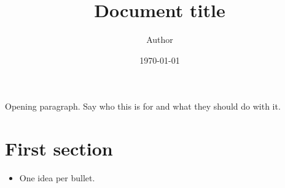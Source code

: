 \documentclass[11pt,a4paper]{article}
\title{Document title}
\author{Author}
\date{\today}
\begin{document}
\maketitle
\thispagestyle{empty}

\noindent
Opening paragraph. Say who this is for and what they should do with it.

\section{First section}

\begin{itemize}
  \item One idea per bullet.
\end{itemize}

\end{document}

